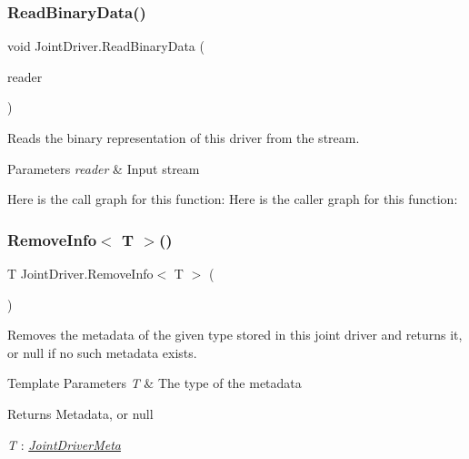 \subsubsection{\texorpdfstring{Read\+Binary\+Data()}{ReadBinaryData()}}
{\footnotesize\ttfamily void Joint\+Driver.\+Read\+Binary\+Data (\begin{DoxyParamCaption}\item[{System.\+I\+O.\+Binary\+Reader}]{reader }\end{DoxyParamCaption})}



Reads the binary representation of this driver from the stream. 


\begin{DoxyParams}{Parameters}
{\em reader} & Input stream\\
\hline
\end{DoxyParams}
Here is the call graph for this function\+:
Here is the caller graph for this function\+:
\mbox{\label{class_joint_driver_ac8981cc67c8ddc2c196717c31d109cc4}} 
\subsubsection{\texorpdfstring{Remove\+Info$<$ T $>$()}{RemoveInfo< T >()}}
{\footnotesize\ttfamily T Joint\+Driver.\+Remove\+Info$<$ T $>$ (\begin{DoxyParamCaption}{ }\end{DoxyParamCaption})}



Removes the metadata of the given type stored in this joint driver and returns it, or null if no such metadata exists. 


\begin{DoxyTemplParams}{Template Parameters}
{\em T} & The type of the metadata\\
\hline
\end{DoxyTemplParams}
\begin{DoxyReturn}{Returns}
Metadata, or null
\end{DoxyReturn}
\begin{Desc}
\item[Type Constraints]\begin{description}
\item[{\em T} : {\em \hyperlink{class_joint_driver_meta}{Joint\+Driver\+Meta}}]\end{description}
\end{Desc}
\mbox{\label{class_joint_driver_a1427fe9a653b2977ed487f140c3af32b}} 
